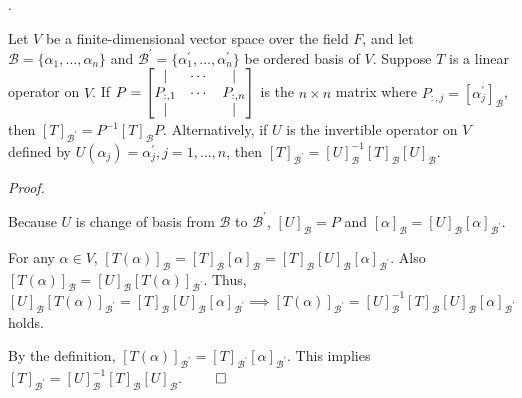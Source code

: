 \documentclass[8pt]{beamer}
\newcommand{\mc}[1]{\mathcal{#1}}
\newcommand{\ti}[1]{\textit{#1}}
\begin{document}

\begin{frame}{.}
    \begin{theorem}
        Let $V$ be a finite-dimensional vector space over the field $F$, and let $\mc{B} = \{\alpha_1, \dots, \alpha_n\}$ and $\mc{B}^\prime = \{\alpha_1^\prime, \dots, \alpha_n^\prime\}$ be ordered basis of $V$.
        Suppose $T$ is a linear operator on $V$.
        If $P = \left[\begin{matrix}
         | & \cdots & | \\ P_{:,1} & \cdots & P_{:, n} \\ | & \empty & | 
        \end{matrix}\right]$ is the $n \times n$ matrix where $P_{:, j} = [\alpha_j^\prime]_\mc{B}$, then $[T]_{\mc{B}^\prime} = P^{-1}[T]_{\mc{B}}P$.
        Alternatively, if $U$ is the invertible operator on $V$ defined by $U(\alpha_j) = \alpha_j^\prime, j=1,\dots, n$, then $[T]_{\mc{B}^\prime} = [U]_{\mc{B}}^{-1}[T]_{\mc{B}}[U]_{\mc{B}}$.
    \end{theorem}
    \ti{Proof.}

    Because $U$ is change of basis from $\mc{B}$ to $\mc{B}^\prime$, $[U]_{\mc{B}} = P$ and $[\alpha]_{\mc{B}} = [U]_{\mc{B}} [\alpha]_{\mc{B}^\prime}$.

    For any $\alpha \in V$, $[T(\alpha)]_{\mc{B}} = [T]_{\mc{B}} [\alpha]_{\mc{B}} = [T]_{\mc{B}} [U]_{\mc{B}} [\alpha]_{\mc{B}^\prime}$.
    Also $[T(\alpha)]_{\mc{B}} = [U]_{\mc{B}}[T(\alpha)]_{\mc{B}^\prime}$.
    Thus, $[U]_{\mc{B}} [T(\alpha)]_{\mc{B}^\prime} = [T]_{\mc{B}}[U]_{\mc{B}}[\alpha]_{\mc{B}^\prime} \implies [T(\alpha)]_{\mc{B}^\prime} = [U]_{\mc{B}}^{-1}[T]_{\mc{B}} [U]_{\mc{B}} [\alpha]_{\mc{B}^\prime}$ holds.

    By the definition, $[T(\alpha)]_{\mc{B}^\prime} = [T]_{\mc{B}^\prime} [\alpha]_{\mc{B}^\prime}$. This implies $[T]_{\mc{B}^\prime} = [U]^{-1}_{\mc{B}} [T]_{\mc{B}} [U]_{\mc{B}}$. $\qed$
\end{frame}
\end{document}
